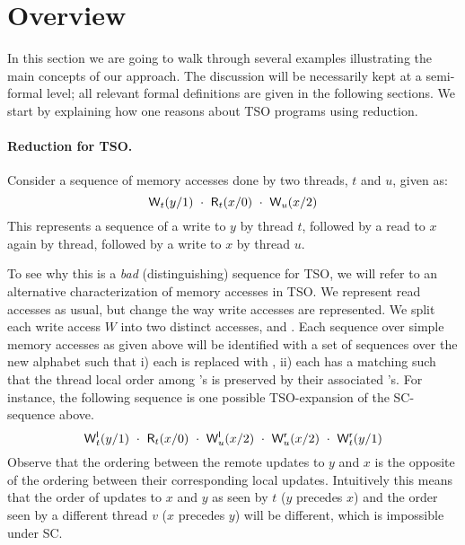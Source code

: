 \documentclass[preprint,9pt]{sigplanconf}
\begin{document}
\section{Overview}
In this section we are going to walk through several examples illustrating the main concepts of our approach.
The discussion will be necessarily kept at a semi-formal level; all relevant formal definitions are given in the following sections.
We start by explaining how one reasons about TSO programs using reduction.

\paragraph{Reduction for TSO.}
Consider a sequence of memory accesses done by two threads, $t$ and $u$, given as:
\[
{\aliwritex t y 1}\ \cdot\ {\alireadx t x 0}\ \cdot\ {\aliwritex u x 2}
\]
This represents a sequence of a write to $y$ by thread $t$, followed by a read to $x$ again by thread, followed by a write to $x$ by thread $u$.

To see why this is a {\em bad} (distinguishing) sequence for TSO, we will refer to an alternative characterization of memory accesses in TSO.
We represent read accesses as usual, but change the way write accesses are represented.
We split each write access $W$ into two distinct accesses, {\locwrite} and {\remwrite}.
Each sequence over simple memory accesses as given above will be identified with a set of sequences over the new alphabet such that i) each {\aliwrite} is replaced with {\locwrite}, ii) each {\locwrite} has a matching {\remwrite} such that the thread local order among {\locwrite}'s is preserved by their associated {\remwrite}'s.
For instance, the following sequence is one possible TSO-expansion of the SC-sequence above.
\[
{\locwritex t y 1}\ \cdot\ {\alireadx t x 0}\ \cdot\ {\locwritex u x 2}\ \cdot\ {\remwritex u x 2}\ \cdot\ {\remwritex t y 1}
\]
Observe that the ordering between the remote updates to $y$ and $x$ is the opposite of the ordering between their corresponding local updates. 
Intuitively this means that the order of updates to $x$ and $y$ as seen by $t$ ($y$ precedes $x$) and the order seen by a different thread $v$ ($x$ precedes $y$) will be different, which is impossible under SC.
\end{document}
